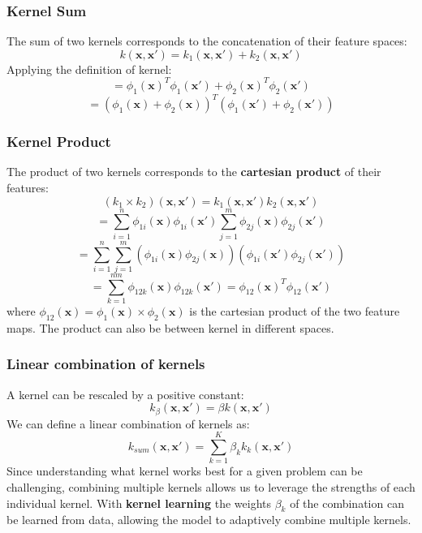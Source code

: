 \subsubsection*{Kernel Sum}
The sum of two kernels corresponds to the concatenation of their feature spaces:
\begin{equation}
    k(\boldsymbol{x}, \boldsymbol{x}') = k_1(\boldsymbol{x}, \boldsymbol{x}') + k_2(\boldsymbol{x}, \boldsymbol{x}')
\end{equation}
Applying the definition of kernel:
\[
= \phi_1(\boldsymbol{x})^T \phi_1(\boldsymbol{x}') + \phi_2(\boldsymbol{x})^T \phi_2(\boldsymbol{x}')
\]
\[
= (\phi_1(\boldsymbol{x}) + \phi_2(\boldsymbol{x}))^T (\phi_1(\boldsymbol{x}') + \phi_2(\boldsymbol{x}'))
\]
\subsubsection*{Kernel Product}
The product of two kernels corresponds to the \textbf{cartesian product} of their features:
\begin{equation}
    (k_1 \times k_2)(\boldsymbol{x}, \boldsymbol{x}') = k_1(\boldsymbol{x}, \boldsymbol{x}') k_2(\boldsymbol{x}, \boldsymbol{x}')
\end{equation}
\[
= \sum_{i = 1}^n \phi_{1i}(\boldsymbol{x})\phi_{1i}(\boldsymbol{x}') \sum_{j = 1}^m \phi_{2j}(\boldsymbol{x})\phi_{2j}(\boldsymbol{x}')
\]
\[
= \sum_{i = 1}^n \sum_{j = 1}^m (\phi_{1i}(\boldsymbol{x}) \phi_{2j}(\boldsymbol{x})) (\phi_{1i}(\boldsymbol{x}') \phi_{2j}(\boldsymbol{x}'))
\]
\[
= \sum_{k = 1}^{nm} \phi_{12k}(\boldsymbol{x}) \phi_{12k}(\boldsymbol{x}') = \phi_{12}(\boldsymbol{x})^T \phi_{12}(\boldsymbol{x}')
\]
where $\phi_{12}(\boldsymbol{x}) = \phi_{1}(\boldsymbol{x}) \times \phi_{2}(\boldsymbol{x})$ is the cartesian product of the two feature maps.
The product can also be between kernel in different spaces.
\subsubsection*{Linear combination of kernels}
A kernel can be rescaled by a positive constant:
\[ k_{\beta}(\boldsymbol{x}, \boldsymbol{x}') = \beta k(\boldsymbol{x}, \boldsymbol{x}')\]
We can define a linear combination of kernels as:
\[k_{sum}(\boldsymbol{x}, \boldsymbol{x}') = \sum_{k=1}^K \beta_k k_k(\boldsymbol{x}, \boldsymbol{x}') \]
Since understanding what kernel works best for a given problem can be challenging, combining multiple kernels allows us to leverage the strengths of each individual kernel.
With \textbf{kernel learning} the weights $\beta_k$ of the combination can be learned from data, allowing the model to adaptively combine multiple kernels.
